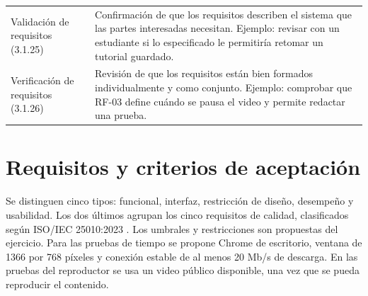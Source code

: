 \documentclass[11pt,a4paper]{article}
\begin{document}
\begin{longtable}{@{}p{.26\linewidth}p{.70\linewidth}@{}}
Validación de requisitos (3.1.25) & Confirmación de que los requisitos describen el sistema que las partes interesadas necesitan. Ejemplo: revisar con un estudiante si lo especificado le permitiría retomar un tutorial guardado. \\
Verificación de requisitos (3.1.26) & Revisión de que los requisitos están bien formados individualmente y como conjunto. Ejemplo: comprobar que RF-03 define cuándo se pausa el video y permite redactar una prueba. \\
\end{longtable}

\section{Requisitos y criterios de aceptación}
Se distinguen cinco tipos: funcional, interfaz, restricción de diseño,
desempeño y usabilidad. Los dos últimos agrupan los cinco
requisitos de calidad, clasificados según ISO/IEC 25010:2023
\cite{iso25010}. Los umbrales y restricciones son propuestas del ejercicio.
Para las pruebas de tiempo se propone Chrome de escritorio, ventana de
1366 por 768 píxeles y conexión estable de al menos 20 Mb/s de descarga.
En las pruebas del reproductor se usa un video público disponible, una vez
que se pueda reproducir el contenido.
\end{document}

